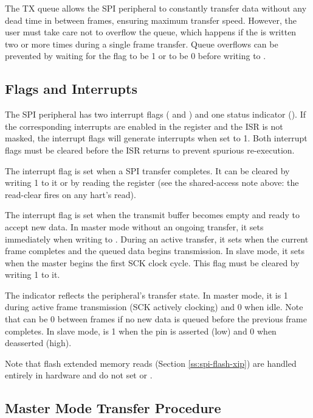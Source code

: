 The TX queue allows the SPI peripheral to constantly transfer data without any dead time in between frames, ensuring maximum transfer speed. However, the user must take care not to overflow the queue, which happens if the  is written two or more times during a single frame transfer. Queue overflows can be prevented by waiting for the  flag to be 1 or  to be 0 before writing to .


\subsection{Flags and Interrupts}

The SPI peripheral has two interrupt flags ( and ) and one status indicator (). If the corresponding interrupts are enabled in the  register and the  ISR is not masked, the interrupt flags will generate interrupts when set to 1. Both interrupt flags must be cleared before the ISR returns to prevent spurious re-execution.

The  interrupt flag is set when a SPI transfer completes. It can be cleared by writing 1 to it or by reading the  register (see the shared-access note above: the read-clear fires on any hart's read).

The  interrupt flag is set when the  transmit buffer becomes empty and ready to accept new data. In master mode without an ongoing transfer, it sets immediately when writing to . During an active transfer, it sets when the current frame completes and the queued data begins transmission. In slave mode, it sets when the master begins the first SCK clock cycle. This flag must be cleared by writing 1 to it.

The  indicator reflects the peripheral's transfer state. In master mode, it is 1 during active frame transmission (SCK actively clocking) and 0 when idle. Note that  can be 0 between frames if no new data is queued before the previous frame completes. In slave mode,  is 1 when the  pin is asserted (low) and 0 when deasserted (high).

Note that flash extended memory reads (Section \ref{ss:spi-flash-xip}) are handled entirely in hardware and do not set  or .

\subsection{Master Mode Transfer Procedure}

